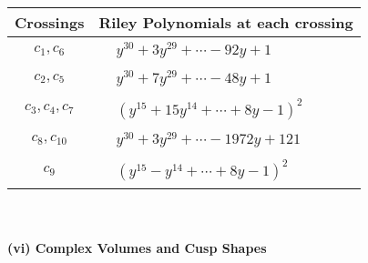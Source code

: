 \documentclass[1p]{elsarticle_modified}
\theoremstyle{definition}
\begin{document}
\begin{tabular}{m{50pt}|m{274pt}}
Crossings & \hspace{64pt}Riley Polynomials at each crossing \\
\hline $$\begin{aligned}c_{1},c_{6}\end{aligned}$$&$\begin{aligned}
&y^{30}+3 y^{29}+\cdots-92 y+1
\end{aligned}$\\
\hline $$\begin{aligned}c_{2},c_{5}\end{aligned}$$&$\begin{aligned}
&y^{30}+7 y^{29}+\cdots-48 y+1
\end{aligned}$\\
\hline $$\begin{aligned}c_{3},c_{4},c_{7}\end{aligned}$$&$\begin{aligned}
&(y^{15}+15 y^{14}+\cdots+8 y-1)^{2}
\end{aligned}$\\
\hline $$\begin{aligned}c_{8},c_{10}\end{aligned}$$&$\begin{aligned}
&y^{30}+3 y^{29}+\cdots-1972 y+121
\end{aligned}$\\
\hline $$\begin{aligned}c_{9}\end{aligned}$$&$\begin{aligned}
&(y^{15}- y^{14}+\cdots+8 y-1)^{2}
\end{aligned}$\\
\hline
\end{tabular}\\~\\
\newpage\flushleft \textbf{(vi) Complex Volumes and Cusp Shapes}
\end{document}
